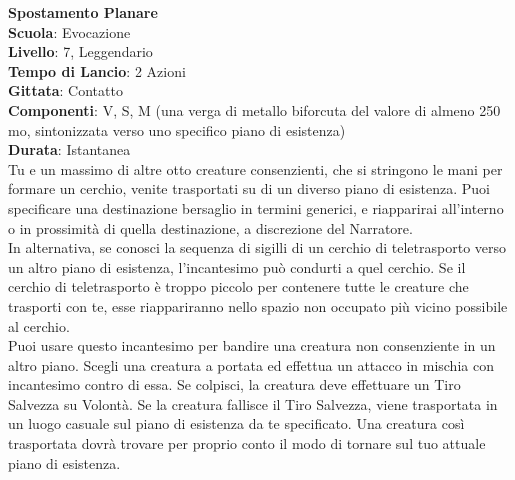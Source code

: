 \begin{multicols}{2}
\medskip\textbf{Spostamento Planare}\\
\textbf{Scuola}: Evocazione\\
\textbf{Livello}: 7, Leggendario\\
\textbf{Tempo di Lancio}: 2 Azioni\\
\textbf{Gittata}: Contatto\\
\textbf{Componenti}: V, S, M (una verga di metallo biforcuta del valore di almeno 250 mo, sintonizzata verso uno specifico piano di esistenza)\\
\textbf{Durata}: Istantanea\\
Tu e un massimo di altre otto creature consenzienti, che si stringono le mani per formare un cerchio, venite trasportati su di un diverso piano di esistenza. Puoi specificare una destinazione bersaglio in termini generici, e riapparirai all'interno o in prossimità di quella destinazione, a discrezione del Narratore.\\
In alternativa, se conosci la sequenza di sigilli di un cerchio di teletrasporto verso un altro piano di esistenza, l'incantesimo può condurti a quel cerchio. Se il cerchio di teletrasporto è troppo piccolo per contenere tutte le creature che trasporti con te, esse riappariranno nello spazio non occupato più vicino possibile al cerchio.\\
Puoi usare questo incantesimo per bandire una creatura non consenziente in un altro piano. Scegli una creatura a portata ed effettua un attacco in mischia con incantesimo contro di essa. Se colpisci, la creatura deve effettuare un Tiro Salvezza su Volontà. Se la creatura fallisce il Tiro Salvezza, viene trasportata in un luogo casuale sul piano di esistenza da te specificato. Una creatura così trasportata dovrà trovare per proprio conto il modo di tornare sul tuo attuale piano di esistenza.


\end{multicols}
